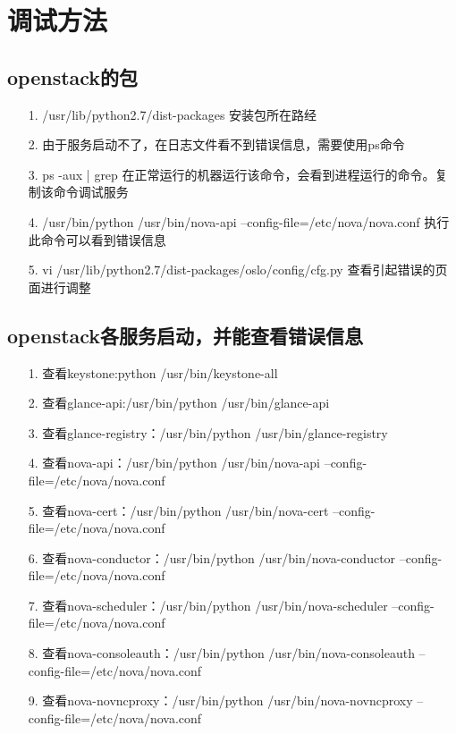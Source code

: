 \documentclass[a4paper,left=1.5cm,right=1.5cm,11pt]{article}
\begin{document}
\tableofcontents

\clearpage
\section{调试方法} 
\subsection{openstack的包}
    \begin{itemize}
        \item[1.]/usr/lib/python2.7/dist-packages  安装包所在路经
		\item[2.]由于服务启动不了，在日志文件看不到错误信息，需要使用ps命令
		\item[3.]ps -aux | grep 在正常运行的机器运行该命令，会看到进程运行的命令。复制该命令调试服务
		\item[4.]/usr/bin/python /usr/bin/nova-api --config-file=/etc/nova/nova.conf 执行此命令可以看到错误信息
		\item[5.]vi /usr/lib/python2.7/dist-packages/oslo/config/cfg.py 查看引起错误的页面进行调整
    \end{itemize}
\subsection{openstack各服务启动，并能查看错误信息}
	\begin{itemize}
		\item[1.]查看keystone:python /usr/bin/keystone-all
		\item[2.]查看glance-api:/usr/bin/python /usr/bin/glance-api		
		\item[3.]查看glance-registry：/usr/bin/python /usr/bin/glance-registry 
		\item[4.]查看nova-api：/usr/bin/python /usr/bin/nova-api --config-file=/etc/nova/nova.conf
		\item[5.]查看nova-cert：/usr/bin/python /usr/bin/nova-cert --config-file=/etc/nova/nova.conf
		\item[6.]查看nova-conductor：/usr/bin/python /usr/bin/nova-conductor --config-file=/etc/nova/nova.conf
		\item[7.]查看nova-scheduler：/usr/bin/python /usr/bin/nova-scheduler --config-file=/etc/nova/nova.conf
		\item[8.]查看nova-consoleauth：/usr/bin/python /usr/bin/nova-consoleauth --config-file=/etc/nova/nova.conf
		\item[9.]查看nova-novncproxy：/usr/bin/python /usr/bin/nova-novncproxy --config-file=/etc/nova/nova.conf
	\end{itemize}
\end{document}
